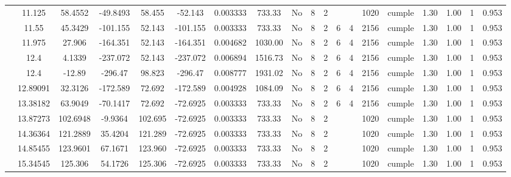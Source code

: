 \begin{table}[H]
{\begin{tabular}{|c|c|c|c|c|c|r|c|c|c|c|c|c|c|c|c|c|c|c|}
\cline{2-19}        & 11.125 & 58.4552 & -49.8493 & 58.455 & -52.143 & 0.003333 & 733.33 & No  & 8   & 2   &     &     & 1020 & \cellcolor[rgb]{ .776,  .937,  .808}cumple & 1.30 & 1.00 & 1   & 0.953 \bigstrut\\
\cline{2-19}        & 11.55 & 45.3429 & -101.155 & 52.143 & -101.155 & 0.003333 & 733.33 & No  & 8   & 2   & 6   & 4   & 2156 & \cellcolor[rgb]{ .776,  .937,  .808}cumple & 1.30 & 1.00 & 1   & 0.953 \bigstrut\\
\cline{2-19}        & 11.975 & 27.906 & -164.351 & 52.143 & -164.351 & 0.004682 & 1030.00 & No  & 8   & 2   & 6   & 4   & 2156 & \cellcolor[rgb]{ .776,  .937,  .808}cumple & 1.30 & 1.00 & 1   & 0.953 \bigstrut\\
\cline{2-19}        & \cellcolor[rgb]{ .851,  .882,  .949}12.4 & 4.1339 & -237.072 & 52.143 & -237.072 & 0.006894 & 1516.73 & No  & 8   & 2   & 6   & 4   & 2156 & \cellcolor[rgb]{ .776,  .937,  .808}cumple & 1.30 & 1.00 & 1   & 0.953 \bigstrut\\
\cline{2-19}        & \cellcolor[rgb]{ .851,  .882,  .949}12.4 & -12.89 & -296.47 & 98.823 & -296.47 & 0.008777 & 1931.02 & No  & 8   & 2   & 6   & 4   & 2156 & \cellcolor[rgb]{ .776,  .937,  .808}cumple & 1.30 & 1.00 & 1   & 0.953 \bigstrut\\
\cline{2-19}        & 12.89091 & 32.3126 & -172.589 & 72.692 & -172.589 & 0.004928 & 1084.09 & No  & 8   & 2   & 6   & 4   & 2156 & \cellcolor[rgb]{ .776,  .937,  .808}cumple & 1.30 & 1.00 & 1   & 0.953 \bigstrut\\
\cline{2-19}        & 13.38182 & 63.9049 & -70.1417 & 72.692 & -72.6925 & 0.003333 & 733.33 & No  & 8   & 2   & 6   & 4   & 2156 & \cellcolor[rgb]{ .776,  .937,  .808}cumple & 1.30 & 1.00 & 1   & 0.953 \bigstrut\\
\cline{2-19}        & 13.87273 & 102.6948 & -9.9364 & 102.695 & -72.6925 & 0.003333 & 733.33 & No  & 8   & 2   &     &     & 1020 & \cellcolor[rgb]{ .776,  .937,  .808}cumple & 1.30 & 1.00 & 1   & 0.953 \bigstrut\\
\cline{2-19}        & 14.36364 & 121.2889 & 35.4204 & 121.289 & -72.6925 & 0.003333 & 733.33 & No  & 8   & 2   &     &     & 1020 & \cellcolor[rgb]{ .776,  .937,  .808}cumple & 1.30 & 1.00 & 1   & 0.953 \bigstrut\\
\cline{2-19}        & 14.85455 & 123.9601 & 67.1671 & 123.960 & -72.6925 & 0.003333 & 733.33 & No  & 8   & 2   &     &     & 1020 & \cellcolor[rgb]{ .776,  .937,  .808}cumple & 1.30 & 1.00 & 1   & 0.953 \bigstrut\\
\cline{2-19}        & 15.34545 & 125.306 & 54.1726 & 125.306 & -72.6925 & 0.003333 & 733.33 & No  & 8   & 2   &     &     & 1020 & \cellcolor[rgb]{ .776,  .937,  .808}cumple & 1.30 & 1.00 & 1   & 0.953 \bigstrut\\

\end{tabular}}
\end{table}
